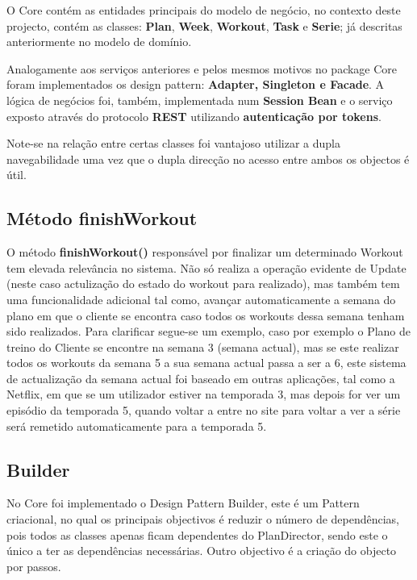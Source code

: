 \hspace{5mm} O Core contém as entidades principais do modelo de negócio, no contexto deste projecto, contém as classes: \textbf{Plan}, \textbf{Week}, \textbf{Workout}, \textbf{Task} e \textbf{Serie}; já descritas anteriormente no modelo de domínio.

\hspace{5mm} Analogamente aos serviços anteriores e pelos mesmos motivos no package Core foram implementados os design pattern: \textbf{Adapter, Singleton e Facade}. A lógica de negócios foi, também, implementada num \textbf{Session Bean} e o serviço exposto através do protocolo \textbf{REST} utilizando \textbf{autenticação por tokens}.

\hspace{5mm} Note-se na relação entre certas classes foi vantajoso utilizar a dupla navegabilidade uma vez que o dupla direcção no acesso entre ambos os objectos é útil. 

\subsection{Método finishWorkout}

\hspace{5mm} O método \textbf{finishWorkout()} responsável por finalizar um determinado Workout tem elevada relevância no sistema. Não só realiza a operação evidente de Update (neste caso actulização do estado do workout para realizado), mas também tem uma funcionalidade adicional tal como, avançar automaticamente a semana do plano em que o cliente se encontra caso todos os workouts dessa semana tenham sido realizados. Para clarificar segue-se um exemplo, caso por exemplo o Plano de treino do Cliente se encontre na semana 3 (semana actual), mas se este realizar todos os workouts da semana 5 a sua semana actual passa a ser a 6, este sistema de actualização da semana actual foi baseado em outras aplicações, tal como a Netflix, em que se um utilizador estiver na temporada 3, mas depois for ver um episódio da temporada 5, quando voltar a entre no site para voltar a ver a série será remetido automaticamente para a temporada 5.

\subsection{Builder}

\hspace{5mm} No Core foi implementado o Design Pattern Builder, este é um Pattern criacional, no qual os principais objectivos é reduzir o número de dependências, pois todos as classes apenas ficam dependentes do PlanDirector, sendo este o único a ter as dependências necessárias. Outro objectivo é a criação do objecto por passos.

